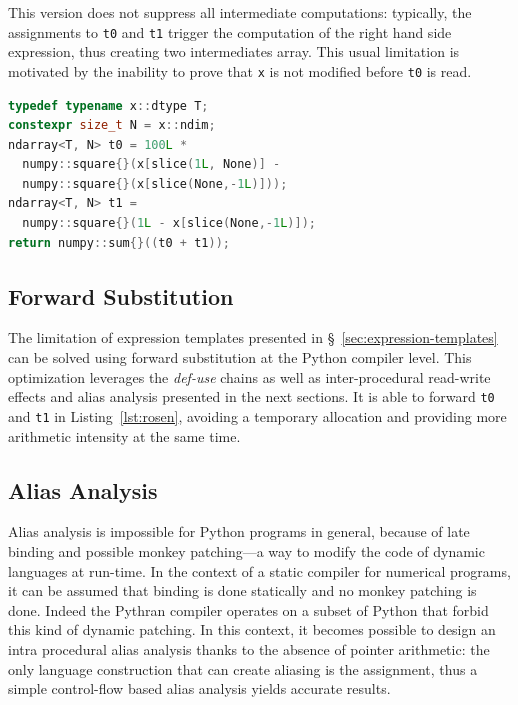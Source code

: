 \documentclass[10pt, preprint]{sigplanconf}
\begin{document}
This version does not suppress all intermediate computations: typically, the
assignments to \texttt{t0} and \texttt{t1} trigger the computation of the right
hand side expression, thus creating two intermediates array. This usual
limitation is motivated by the inability to prove that \texttt{x} is not
modified before \texttt{t0} is read.

\begin{lstlisting}[language=c++,
  caption={C++11 translated version of Python version for the Rosenbrock
           kernel.},
  label={lst:rosen-cxx},
  breaklines=true,
  basicstyle=\small]
typedef typename x::dtype T;
constexpr size_t N = x::ndim;
ndarray<T, N> t0 = 100L *
  numpy::square{}(x[slice(1L, None)] -
  numpy::square{}(x[slice(None,-1L)]));
ndarray<T, N> t1 =
  numpy::square{}(1L - x[slice(None,-1L)]);
return numpy::sum{}((t0 + t1));
\end{lstlisting}


\subsection{Forward Substitution}
\label{sec:fs}

The limitation of expression templates presented in
\S~\ref{sec:expression-templates} can be solved using forward substitution at
the Python compiler level. This optimization leverages the
\textit{def-use} chains as well as inter-procedural read-write
effects and alias analysis presented in the next sections.
It is able to forward \texttt{t0} and \texttt{t1} in
Listing~\ref{lst:rosen}, avoiding a temporary allocation and providing more
arithmetic intensity at the same time.


\subsection{Alias Analysis}
\label{sec:alias}

Alias analysis is impossible for Python programs in general, because of late
binding and possible monkey patching---a way to modify the code of dynamic
languages at run-time. In the context of a static compiler for
numerical programs, it can be assumed that binding is done statically and no
monkey patching is done. Indeed the Pythran compiler operates on a subset of
Python that forbid this kind of dynamic patching.
In this context, it becomes possible to design an intra procedural alias
analysis thanks to the absence of pointer arithmetic:
the only language construction that can create aliasing is the assignment, thus
a simple control-flow based alias analysis yields accurate results.
\end{document}
